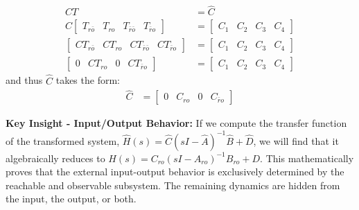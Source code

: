 \documentclass[twoside, 11pt, a4paper]{article}
\begin{document}
\begin{align*}
    C T &= \hat{C} 
    \\
    C \left[ \begin{array}{c|c|c|c} T_{r\bar{o}} & T_{ro} & T_{\bar{r} \bar{o}} & T_{\bar{r} o} \end{array} \right] &= 
    \left[ \begin{array}{c|c|c|c} C_1 & C_2 & C_3 & C_4 \end{array} \right]
    \\
    \left[ \begin{array}{c|c|c|c} C T_{r\bar{o}} & C T_{ro} & C T_{\bar{r} \bar{o}} & C T_{\bar{r} o} \end{array} \right] &= 
    \left[ \begin{array}{c|c|c|c} C_1 & C_2 & C_3 & C_4 \end{array} \right]
    \\
    \left[ \begin{array}{c|c|c|c} 0 & C T_{ro} & 0 & C T_{\bar{r} o} \end{array} \right] &= 
    \left[ \begin{array}{c|c|c|c} C_1 & C_2 & C_3 & C_4 \end{array} \right]
\end{align*}
%
and thus $\hat{C}$ takes the form:
\begin{align*}
    \hat{C} &= \left[ \begin{array}{c|c|c|c} 0 & C_{ro} & 0 & C_{\bar{r}o} \end{array} \right]
\end{align*}

\textbf{Key Insight - Input/Output Behavior:} If we compute the transfer function of the transformed system, $\hat{H}(s) = \hat{C}(sI - \hat{A})^{-1}\hat{B} + \hat{D}$, we will find that it algebraically reduces to $H(s) = C_{ro}(sI - A_{ro})^{-1}B_{ro} + D$. This mathematically proves that the external input-output behavior is exclusively determined by the reachable and observable subsystem. The remaining dynamics are hidden from the input, the output, or both.
\end{document}
